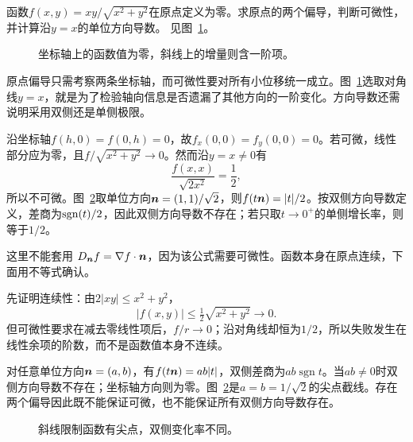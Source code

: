 \begin{exercise}[偏导存在但不可微]\label{ex:c3-h3}
函数$f(x,y)=xy/\sqrt{x^2+y^2}$在原点定义为零。求原点的两个偏导，判断可微性，并计算沿$y=x$的单位方向导数。 见图~\ref{fig:c3-h3-q}。
\end{exercise}

\begin{figure}[H]\centering
{}
\caption{坐标轴上的函数值为零，斜线上的增量则含一阶项。}\label{fig:c3-h3-q}
\end{figure}
\begin{solution}
原点偏导只需考察两条坐标轴，而可微性要对所有小位移统一成立。图~\ref{fig:c3-h3-q}选取对角线$y=x$，就是为了检验轴向信息是否遗漏了其他方向的一阶变化。方向导数还需说明采用双侧还是单侧极限。


沿坐标轴$f(h,0)=f(0,h)=0$，故$f_x(0,0)=f_y(0,0)=0$。若可微，线性部分应为零，且$f/\sqrt{x^2+y^2}\to0$。然而沿$y=x\ne0$有
\[\frac{f(x,x)}{\sqrt{2x^2}}=\frac12,
\]
所以不可微。图~\ref{fig:c3-h3-s}取单位方向$\bm{n}=(1,1)/\sqrt2$，则$f(t\bm{n})=|t|/2$。按双侧方向导数定义，差商为$\operatorname{sgn}(t)/2$，因此双侧方向导数不存在；若只取$t\to0^+$的单侧增长率，则等于$1/2$。

这里不能套用 $D_{\bm{n}}f=\nabla f\cdot\bm{n}$，因为该公式需要可微性。函数本身在原点连续，下面用不等式确认。


先证明连续性：由$2|xy|\le x^2+y^2$，
\[|f(x,y)|\le\tfrac12\sqrt{x^2+y^2}\to0.\]
但可微性要求在减去零线性项后，$f/r\to0$；沿对角线却恒为$1/2$，所以失败发生在线性余项的阶数，而不是函数值本身不连续。

对任意单位方向$\bm{n}=(a,b)$，有$f(t\bm{n})=ab|t|$，双侧差商为$ab\operatorname{sgn}t$。当$ab\ne0$时双侧方向导数不存在；坐标轴方向则为零。图~\ref{fig:c3-h3-s}是$a=b=1/\sqrt2$的尖点截线。存在两个偏导因此既不能保证可微，也不能保证所有双侧方向导数存在。

\begin{figure}[H]\centering
{}
\caption{斜线限制函数有尖点，双侧变化率不同。}\label{fig:c3-h3-s}
\end{figure}
\end{solution}

